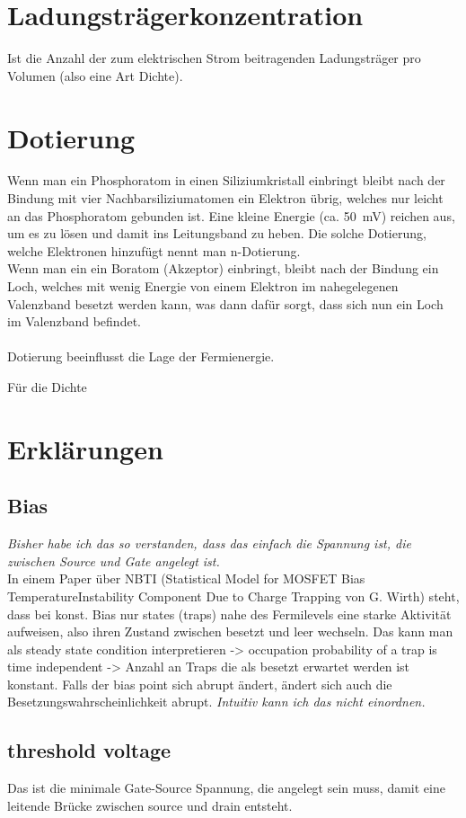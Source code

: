 \documentclass[paper=a4,10pt]{scrartcl}
\begin{document}
\section{Ladungsträgerkonzentration}
Ist die Anzahl der zum elektrischen Strom beitragenden Ladungsträger pro Volumen (also eine Art Dichte).

\section{Dotierung}
Wenn man ein Phosphoratom in einen Siliziumkristall einbringt bleibt nach der Bindung mit vier Nachbarsiliziumatomen ein Elektron übrig, welches nur leicht an das Phosphoratom gebunden ist. Eine kleine Energie (ca. \SI{50}{\milli\volt}) reichen aus, um es zu lösen und damit ins Leitungsband zu heben. Die solche Dotierung, welche Elektronen hinzufügt nennt man n-Dotierung.\\
Wenn man ein ein Boratom (Akzeptor) einbringt, bleibt nach der Bindung ein Loch, welches mit wenig Energie von einem Elektron im nahegelegenen Valenzband besetzt werden kann, was dann dafür sorgt, dass sich nun ein Loch im Valenzband befindet.\\\\
Dotierung beeinflusst die Lage der Fermienergie.

Für die Dichte 	



\section{Erklärungen}
\subsection{Bias}
\textit{Bisher habe ich das so verstanden, dass das einfach die Spannung ist, die zwischen Source und Gate angelegt ist.} \\

\noindent
In einem Paper über NBTI (Statistical Model for MOSFET Bias TemperatureInstability Component Due to Charge Trapping von G. Wirth) steht, dass bei konst. Bias nur states (traps) nahe des Fermilevels eine starke Aktivität aufweisen, also ihren Zustand zwischen besetzt und leer wechseln. Das kann man als steady state condition interpretieren -> occupation probability of a trap is time independent -> Anzahl an Traps die als besetzt erwartet werden ist konstant. Falls der bias point sich abrupt ändert, ändert sich auch die Besetzungswahrscheinlichkeit abrupt.
\textit{Intuitiv kann ich das nicht einordnen.}

\subsection{threshold voltage}
Das ist die minimale Gate-Source Spannung, die angelegt sein muss, damit eine leitende Brücke zwischen source und drain entsteht.
\end{document}
